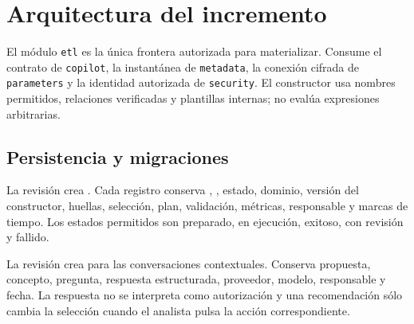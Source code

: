 \documentclass[11pt,letterpaper]{article}
\newcommand{\file}[1]{\texttt{#1}}
\begin{document}
\section{Arquitectura del incremento}

\begin{center}
\end{center}

El módulo \file{etl} es la única frontera autorizada para materializar. Consume el contrato de \file{copilot}, la instantánea de \file{metadata}, la conexión cifrada de \file{parameters} y la identidad autorizada de \file{security}. El constructor usa nombres permitidos, relaciones verificadas y plantillas internas; no evalúa expresiones arbitrarias.

\subsection{Persistencia y migraciones}

La revisión  crea . Cada registro conserva , , estado, dominio, versión del constructor, huellas, selección, plan, validación, métricas, responsable y marcas de tiempo. Los estados permitidos son preparado, en ejecución, exitoso, con revisión y fallido.

La revisión  crea  para las conversaciones contextuales. Conserva propuesta, concepto, pregunta, respuesta estructurada, proveedor, modelo, responsable y fecha. La respuesta no se interpreta como autorización y una recomendación sólo cambia la selección cuando el analista pulsa la acción correspondiente.
\end{document}
